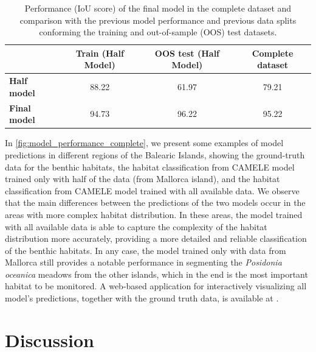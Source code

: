 \begin{table}[H]
    \centering
    \caption{Performance (IoU score) of the final model in the complete dataset
        and
        comparison with the previous model performance and previous data splits
        conforming the training and out-of-sample (OOS) test datasets.}
    \label{tab:my-table}
    \begin{tabular}{lccc}
        \hline
                                       & \textbf{Train (Half Model)}
                                       &
        \textbf{OOS test (Half Model)} &
        \textbf{Complete
            dataset}
        \\
        \hline
        \textbf{Half model}            & 88.22
                                       & 61.97                       &
        79.21
        \\
        \textbf{Final model}           & 94.73
                                       & 96.22                       &
        95.22
        \\\hline
    \end{tabular}
\end{table}

In \cref{fig:model_performance_complete}, we present some examples of model
predictions in different regions of the Balearic Islands, showing the
ground-truth data for the benthic habitats, the habitat classification from
CAMELE model trained only with half of the data (from Mallorca island), and the
habitat classification from CAMELE model trained with all available data. We
observe that the main differences between the predictions of the two models
occur in the areas with more complex habitat distribution. In these areas, the
model trained with all available data is able to capture the complexity of the
habitat distribution more accurately, providing a more detailed and reliable
classification of the benthic habitats. In any case, the model trained only
with data from Mallorca still provides a notable performance in segmenting the
\textit{Posidonia oceanica} meadows from the other islands, which in the end is
the most important habitat to be monitored. A web-based application for
interactively visualizing all model's predictions, together with the ground
truth data, is available at \cite{Webpage_camele}.

\section{Discussion}

